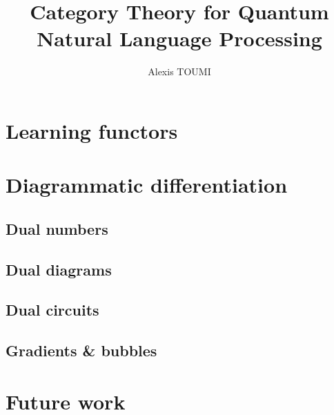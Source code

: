 \documentclass[a4paper,twoside]{ociamthesis}
\title{Category Theory for Quantum\\Natural Language Processing}
\author{Alexis TOUMI} \college{Wolfson College} \degree{Doctor of Philosophy}
\begin{document}
\maketitle

\tableofcontents




























\section{Learning functors}

\section{Diagrammatic differentiation} \label{chapter-3:diag-diff}
\subsection{Dual numbers}
\subsection{Dual diagrams}
\subsection{Dual circuits}
\subsection{Gradients \& bubbles}

\section{Future work}

\renewcommand*\MakeUppercase[1]{#1}%
\setlength{\baselineskip}{0pt} %
\printbibliography[heading=bibintoc,title=References]
\end{document}
